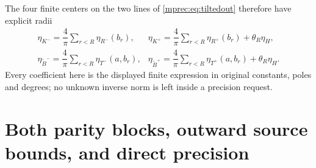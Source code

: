 The four finite centers on the two lines of \eqref{mprec:eq:tiltedout}
therefore have explicit radii
\[
 \begin{array}{ll}
 \eta_{K^-}=\dfrac4\pi\sum_{r<R}\eta_{R^-}(b_r),&
 \eta_{K^+}=\dfrac4\pi\sum_{r<R}\eta_{R^+}(b_r)+\theta_R\eta_H,\\[3pt]
 \eta_{\widetilde B^-}=\dfrac4\pi\sum_{r<R}\eta_{T^-}(a,b_r),&
 \eta_{\widetilde B^+}=\dfrac4\pi\sum_{r<R}\eta_{T^+}(a,b_r)
                                      +\theta_R\eta_H.
 \end{array}
\]
Every coefficient here is the displayed finite expression in
original constants, poles and degrees; no unknown inverse norm
is left inside a precision request.

\section{Both parity blocks, outward source bounds, and direct precision}

